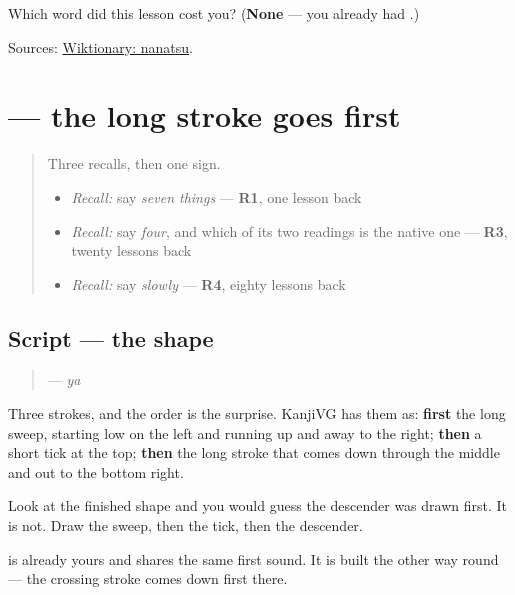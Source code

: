 \begin{tcolorbox}[breakable,colback=teal!4,colframe=teal!35!black,title={Before you move on}]
Which word did this lesson cost you? (\textbf{None} — you already had \textbf{}.)

Sources: \href{https://en.wiktionary.org/wiki/\%E4\%B8\%83\%E3\%81\%A4}{Wiktionary: nanatsu}.
\end{tcolorbox}
\section[\texorpdfstring{\ja{や} (ya)}{や (ya)}]{ — the long stroke goes first}

\label{lesson:JA-W17-ya}



\begin{quote}
Three recalls, then one sign.

\begin{itemize}
\raggedright
  \item \emph{Recall:} say \emph{seven things} — \textbf{R1}, one lesson back
  \item \emph{Recall:} say \emph{four}, and which of its two readings is the native one — \textbf{R3}, twenty lessons back
  \item \emph{Recall:} say \emph{slowly} — \textbf{R4}, eighty lessons back
\end{itemize}
\end{quote}

\subsection*{Script — the shape}

\begin{quote}
\textbf{} — \emph{ya}
\end{quote}

Three strokes, and the order is the surprise. KanjiVG has them as: \textbf{first} the long sweep, starting low on the left and running up and away to the right; \textbf{then} a short tick at the top; \textbf{then} the long stroke that comes down through the middle and out to the bottom right.

Look at the finished shape and you would guess the descender was drawn first. It is not. Draw the sweep, then the tick, then the descender.

\textbf{} is already yours and shares the same first sound. It is built the other way round — the crossing stroke comes down first there.

